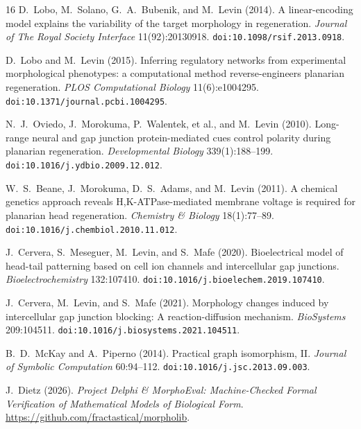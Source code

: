 \documentclass[11pt,a4paper]{article}
\theoremstyle{definition}
\theoremstyle{remark}
\begin{document}
\begin{thebibliography}{16}
D.~Lobo, M.~Solano, G.~A.~Bubenik, and M.~Levin (2014). A linear-encoding model explains the variability of the target morphology in regeneration. \emph{Journal of The Royal Society Interface} 11(92):20130918. \texttt{doi:10.1098/rsif.2013.0918}.

D.~Lobo and M.~Levin (2015). Inferring regulatory networks from experimental morphological phenotypes: a computational method reverse-engineers planarian regeneration. \emph{PLOS Computational Biology} 11(6):e1004295. \texttt{doi:10.1371/journal.pcbi.1004295}.

N.~J.~Oviedo, J.~Morokuma, P.~Walentek, et al., and M.~Levin (2010). Long-range neural and gap junction protein-mediated cues control polarity during planarian regeneration. \emph{Developmental Biology} 339(1):188--199. \texttt{doi:10.1016/j.ydbio.2009.12.012}.

W.~S.~Beane, J.~Morokuma, D.~S.~Adams, and M.~Levin (2011). A chemical genetics approach reveals H,K-ATPase-mediated membrane voltage is required for planarian head regeneration. \emph{Chemistry \& Biology} 18(1):77--89. \texttt{doi:10.1016/j.chembiol.2010.11.012}.

J.~Cervera, S.~Meseguer, M.~Levin, and S.~Mafe (2020). Bioelectrical model of head-tail patterning based on cell ion channels and intercellular gap junctions. \emph{Bioelectrochemistry} 132:107410. \texttt{doi:10.1016/j.bioelechem.2019.107410}.

J.~Cervera, M.~Levin, and S.~Mafe (2021). Morphology changes induced by intercellular gap junction blocking: A reaction-diffusion mechanism. \emph{BioSystems} 209:104511. \texttt{doi:10.1016/j.biosystems.2021.104511}.

B.~D.~McKay and A.~Piperno (2014). Practical graph isomorphism, II. \emph{Journal of Symbolic Computation} 60:94--112. \texttt{doi:10.1016/j.jsc.2013.09.003}.

J.~Dietz (2026). \emph{Project Delphi \& MorphoEval: Machine-Checked Formal Verification of Mathematical Models of Biological Form}. \url{https://github.com/fractastical/morpholib}.
\end{thebibliography}
\end{document}

